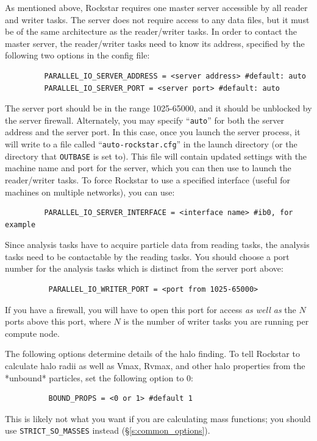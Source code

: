 \documentclass[12pt]{article}
\begin{document}
      As mentioned above, Rockstar requires one master server accessible by
      all reader and writer tasks.  The server does not require access to any
      data files, but it must be of the same architecture as the reader/writer tasks.  In order to contact the master server, the reader/writer tasks need to know its address, specified by the following two
      options in the config file:
\begin{verbatim}
      	 PARALLEL_IO_SERVER_ADDRESS = <server address> #default: auto
      	 PARALLEL_IO_SERVER_PORT = <server port> #default: auto
\end{verbatim}
      The server port should be in the range 1025-65000, and it should be
      unblocked by the server firewall.  Alternately, you may specify
      ``\texttt{auto}'' for both the server address and the server port.  In this case,
      once you launch the server process, it will write to a file called
      ``\texttt{auto-rockstar.cfg}'' in the launch directory (or the directory that
      \texttt{OUTBASE} is set to).  This file will contain updated settings with
      the machine name and port for the server, which you can then use
      to launch the reader/writer tasks.  To force Rockstar to use a
      specified interface (useful for machines on multiple networks),
      you can use:
\begin{verbatim}
      	 PARALLEL_IO_SERVER_INTERFACE = <interface name> #ib0, for example
\end{verbatim}
      Since analysis tasks have to acquire particle data from reading tasks,
      the analysis tasks need to be contactable by the reading tasks.  You
      should choose a port number for the analysis tasks which is distinct
      from the server port above:
\begin{verbatim}
          PARALLEL_IO_WRITER_PORT = <port from 1025-65000>
\end{verbatim}
      If you have a firewall, you will have to open this port for access
      \textit{as well as} the $N$ ports above this port, where $N$ is the number of
      writer tasks you are running per compute node.

      The following options determine details of the halo finding.  To tell
      Rockstar to calculate halo radii as well as Vmax, Rvmax, and other
      halo properties from the *unbound* particles, set the following option
      to 0:
\begin{verbatim}
          BOUND_PROPS = <0 or 1> #default 1
\end{verbatim}
	This is likely not what you want if you are calculating mass functions; you should use \texttt{STRICT\_SO\_MASSES} instead (\S \ref{s:common_options}).
\end{document}
